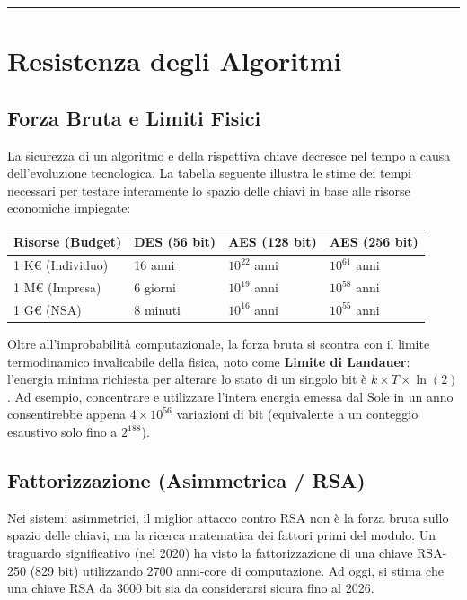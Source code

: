 \documentclass[12pt, a4paper]{report}
\begin{document}
\noindent\rule{\textwidth}{0.4pt}

\section{Resistenza degli Algoritmi}

\subsection{Forza Bruta e Limiti Fisici}
La sicurezza di un algoritmo e della rispettiva chiave decresce nel tempo a causa dell'evoluzione tecnologica. La tabella seguente illustra le stime dei tempi necessari per testare interamente lo spazio delle chiavi in base alle risorse economiche impiegate:

\begin{table}[H]
	\centering
	\begin{tabular}{|l|l|l|l|}
		\hline
		\textbf{Risorse (Budget)} & \textbf{DES (56 bit)} & \textbf{AES (128 bit)} & \textbf{AES (256 bit)} \\ \hline
		1 K€ (Individuo) & 16 anni & $10^{22}$ anni & $10^{61}$ anni \\ \hline
		1 M€ (Impresa) & 6 giorni & $10^{19}$ anni & $10^{58}$ anni \\ \hline
		1 G€ (NSA) & 8 minuti & $10^{16}$ anni & $10^{55}$ anni \\ \hline
	\end{tabular}
\end{table}

Oltre all'improbabilità computazionale, la forza bruta si scontra con il limite termodinamico invalicabile della fisica, noto come \textbf{Limite di Landauer}: l'energia minima richiesta per alterare lo stato di un singolo bit è $k \times T \times \ln(2)$. Ad esempio, concentrare e utilizzare l'intera energia emessa dal Sole in un anno consentirebbe appena $4 \times 10^{56}$ variazioni di bit (equivalente a un conteggio esaustivo solo fino a $2^{188}$).

\subsection{Fattorizzazione (Asimmetrica / RSA)}
Nei sistemi asimmetrici, il miglior attacco contro RSA non è la forza bruta sullo spazio delle chiavi, ma la ricerca matematica dei fattori primi del modulo. Un traguardo significativo (nel 2020) ha visto la fattorizzazione di una chiave RSA-250 (829 bit) utilizzando 2700 anni-core di computazione. Ad oggi, si stima che una chiave RSA da 3000 bit sia da considerarsi sicura fino al 2026.
\end{document}
